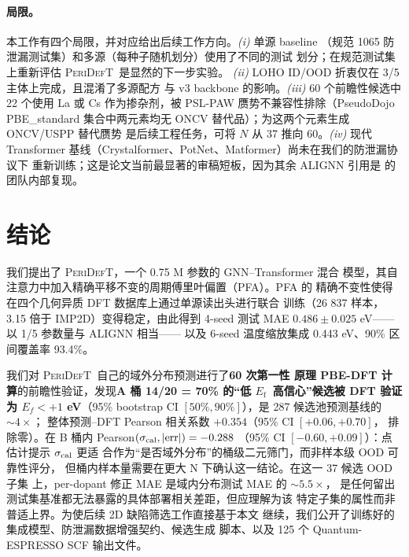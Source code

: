 \documentclass[UTF8,11pt,a4paper]{ctexart}
\newcommand{\Ef}{$E_{\mathrm{f}}$}
\newcommand{\modelname}{\textsc{PeriDefT}}
\begin{document}
\paragraph{局限。}
本工作有四个局限，并对应给出后续工作方向。\emph{(i)} 单源 baseline
（规范 1065 防泄漏测试集）和多源（每种子随机划分）使用了不同的测试
划分；在规范测试集上重新评估 \modelname\ 是显然的下一步实验。
\emph{(ii)} LOHO ID/OOD 折衷仅在 3/5 主体上完成，且混淆了多源配方
与 v3 backbone 的影响。\emph{(iii)} 60 个前瞻性候选中 22 个使用 La
或 Cs 作为掺杂剂，被 PSL-PAW 赝势不兼容性排除（PseudoDojo PBE\_standard
集合中两元素均无 ONCV 替代品）；为这两个元素生成 ONCV/USPP 替代赝势
是后续工程任务，可将 $N$ 从 37 推向 60。\emph{(iv)} 现代 Transformer
基线（Crystalformer、PotNet、Matformer）尚未在我们的防泄漏协议下
重新训练；这是论文当前最显著的审稿短板，因为其余 ALIGNN 引用是
\cite{ourPaperV12} 的团队内部复现。

\section{结论}\label{sec:conclusion_short}

我们提出了 \modelname，一个 0.75 M 参数的 GNN--Transformer 混合
模型，其自注意力中加入精确平移不变的周期傅里叶偏置（PFA）。PFA 的
精确不变性使得在四个几何异质 DFT 数据库上通过单源读出头进行联合
训练（26 837 样本，3.15 倍于 IMP2D）变得稳定，由此得到 4-seed
测试 MAE $0.486\pm0.025$ eV——以 1/5 参数量与 ALIGNN 相当——
以及 6-seed 温度缩放集成 0.443 eV、90\% 区间覆盖率 93.4\%。

我们对 \modelname\ 自己的域外分布预测进行了\textbf{60 次第一性
原理 PBE-DFT 计算}的前瞻性验证，发现\textbf{A 桶 14/20 = 70\%
的``低 \Ef\ 高信心''候选被 DFT 验证为 $E_f<+1$ eV}（95\%
bootstrap CI $[50\%, 90\%]$），是 287 候选池预测基线的 $\sim 4\times$；
整体预测--DFT Pearson 相关系数 $+0.354$（95\% CI $[+0.06, +0.70]$，
排除零）。在 B 桶内
Pearson$(\sigma_{\rm cal}, |\mathrm{err}|) = -0.288$
（95\% CI $[-0.60, +0.09]$）：点估计提示 $\sigma_{\rm cal}$ 更适
合作为``是否域外分布''的桶级二元筛门，而非样本级 OOD 可靠性评分，
但桶内样本量需要在更大 N 下确认这一结论。在这一 37 候选 OOD 子集
上，per-dopant 修正 MAE 是域内分布测试 MAE 的 $\sim 5.5\times$，
是任何留出测试集基准都无法暴露的具体部署相关差距，但应理解为该
特定子集的属性而非普适上界。为使后续 2D 缺陷筛选工作直接基于本文
继续，我们公开了训练好的集成模型、防泄漏数据增强契约、候选生成
脚本、以及 125 个 Quantum-ESPRESSO SCF 输出文件。

\end{document}
